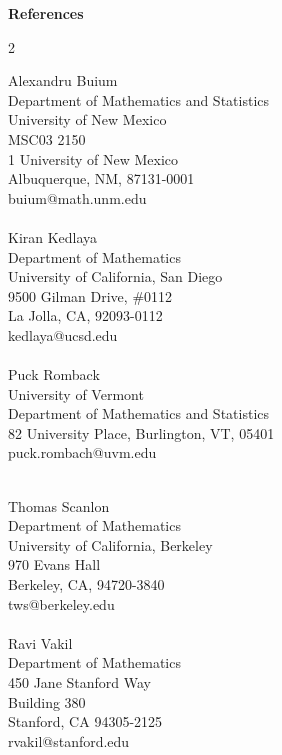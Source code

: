 \documentclass[a4paper,10pt]{article}
\begin{document}

\newpage 

\iffalse 
\noindent \textbf{\Large{References}}
\begin{multicols}{2}
	\begin{flushleft}
		Alexandru Buium\\
		Department of Mathematics and Statistics\\
		University of New Mexico\\
		MSC03 2150\\
		1 University of New Mexico\\
		Albuquerque, NM, 87131-0001\\
		buium@math.unm.edu\\ \ \\
	
		Kiran Kedlaya\\
		Department of Mathematics\\
		University of California, San Diego\\
		9500 Gilman Drive, \#0112\\
		La Jolla, CA, 92093-0112\\
		kedlaya@ucsd.edu \\ \ \\
		
		Puck Romback \\
		University of Vermont \\
		Department of Mathematics and Statistics \\
		82 University Place, Burlington, VT, 05401  \\ 
		puck.rombach@uvm.edu \\  \ \\
\end{flushleft}



\begin{flushleft}
	Thomas Scanlon\\
Department of Mathematics\\
University of California, Berkeley\\
970 Evans Hall\\
Berkeley, CA, 94720-3840\\
tws@berkeley.edu \\ \ \\


	Ravi Vakil\\
	Department of Mathematics\\
	450 Jane Stanford Way\\
	Building 380\\
	Stanford, CA 94305-2125\\
	rvakil@stanford.edu\\ \ \\


\end{flushleft}
\end{multicols}
\end{document}
